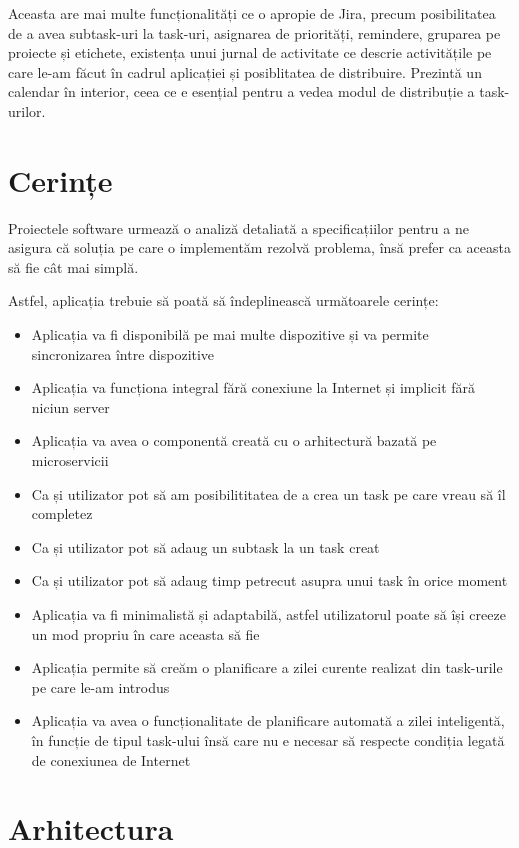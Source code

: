 Aceasta are mai multe funcționalități ce o apropie de Jira, precum posibilitatea de a avea
subtask-uri la task-uri, asignarea de priorități, remindere, gruparea pe proiecte
și etichete, existența unui jurnal de activitate ce descrie activitățile pe care le-am făcut
în cadrul aplicației și posiblitatea de distribuire. Prezintă un calendar în interior,
ceea ce e esențial pentru a vedea modul de distribuție a task-urilor.

\section{Cerințe}

Proiectele software urmează o analiză detaliată a specificațiilor pentru a ne
asigura că soluția pe care o implementăm rezolvă problema, însă prefer ca aceasta
să fie cât mai simplă.

Astfel, aplicația trebuie să poată să îndeplinească următoarele cerințe:

\begin{itemize}
\item Aplicația va fi disponibilă pe mai multe dispozitive și va permite sincronizarea
între dispozitive
\item Aplicația va funcționa integral fără conexiune la Internet și implicit fără niciun server
\item Aplicația va avea o componentă creată cu o arhitectură bazată pe microservicii
    \item Ca și utilizator pot să am posibilititatea de a crea un task pe care vreau să îl completez
\item Ca și utilizator pot să adaug un subtask la un task creat
    \item Ca și utilizator pot să adaug timp petrecut asupra unui task în orice moment
    \item Aplicația va fi minimalistă și adaptabilă, astfel utilizatorul poate să
își creeze un mod propriu în care aceasta să fie
\item Aplicația permite să creăm o planificare a zilei curente realizat din task-urile pe care le-am introdus
    \item Aplicația va avea o funcționalitate de planificare automată a zilei inteligentă, în funcție de tipul task-ului însă
care nu e necesar să respecte condiția legată de conexiunea de Internet
\end{itemize}

\section{Arhitectura}

